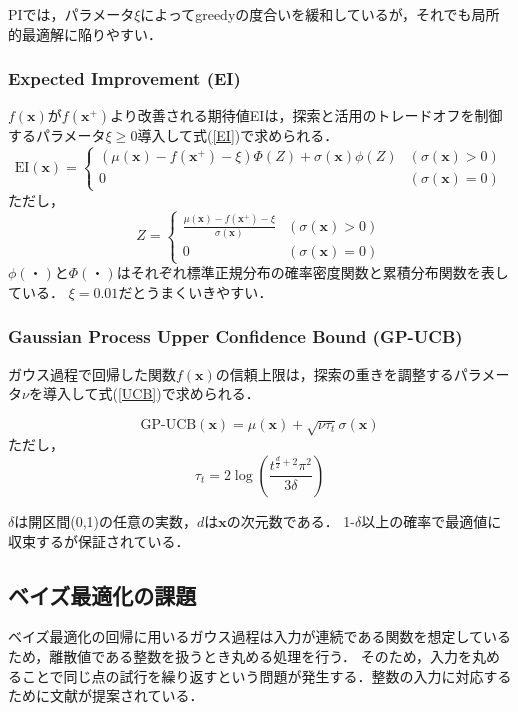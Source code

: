 \documentclass[a4paper,11pt]{jarticle}
\begin{document}
PIでは，パラメータ$\xi$によってgreedyの度合いを緩和しているが，それでも局所的最適解に陥りやすい．

\subsubsection{Expected Improvement (EI)}
$f(\mathbf{x})$が$f(\mathbf{x}^+)$より改善される期待値EIは，探索と活用のトレードオフを制御するパラメータ$\xi\geq0$導入して式(\ref{EI})で求められる．
\begin{equation}
  \text{EI}(\mathbf{x}) = \left \{
  \begin{array}{ll}
    (\mu(\mathbf{x})-f(\mathbf{x}^+)-\xi)\Phi(Z) + \sigma(\mathbf{x})\phi(Z) & (\sigma(\mathbf{x}) > 0) \\
    0 & (\sigma(\mathbf{x}) = 0) \label{EI}
  \end{array}
  \right.
\end{equation}
ただし，
$$
  Z = \left \{
  \begin{array}{ll}
    \frac{\mu(\mathbf{x})-f(\mathbf{x}^+)-\xi}{\sigma(\mathbf{x})} & (\sigma(\mathbf{x}) > 0) \\
    0 & (\sigma(\mathbf{x}) = 0)
  \end{array}
  \right.
$$
$\phi(・)$と$\Phi(・)$はそれぞれ標準正規分布の確率密度関数と累積分布関数を表している．
$\xi=0.01$だとうまくいきやすい\cite{Lizotte:2008:PBO:1626686}．

\subsubsection{Gaussian Process Upper Confidence Bound (GP-UCB)}
ガウス過程で回帰した関数$f(\mathbf{x})$の信頼上限は，探索の重きを調整するパラメータ$\nu$を導入して式(\ref{UCB})で求められる．

\begin{equation}
  \text{GP-UCB}(\mathbf{x})=\mu(\mathbf{x})+\sqrt{\nu\tau_t}\sigma(\mathbf{x}) \label{UCB}
\end{equation}
ただし，
$$\tau_t=2\log\left(\frac{t^{\frac{d}{2}+2}\pi^2}{3\delta}\right)$$

$\delta$は開区間(0,1)の任意の実数，$d$は$\mathbf{x}$の次元数である．
1-$\delta$以上の確率で最適値に収束するが保証されている\cite{Srinivas}．

\subsection{ベイズ最適化の課題}
ベイズ最適化の回帰に用いるガウス過程は入力が連続である関数を想定しているため，離散値である整数を扱うとき丸める処理を行う．
そのため，入力を丸めることで同じ点の試行を繰り返すという問題が発生する．整数の入力に対応するために文献\cite{Garrido-Merchan2018}が提案されている．
\end{document}
